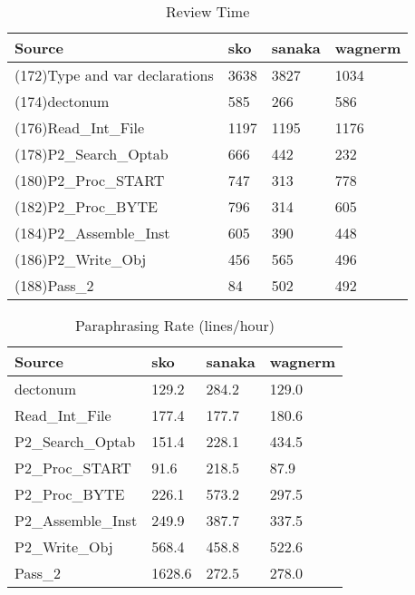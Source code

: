 \begin{table}[hb]
\begin{center}
\begin{tabular}{|l|l|l|l|}
\hline
Source & sko & sanaka & wagnerm\\
\hline
(172)Type and var declarations & 3638 & 3827 & 1034\\
(174)dectonum & 585 & 266 & 586\\
(176)Read\_Int\_File & 1197 & 1195 & 1176\\
(178)P2\_Search\_Optab & 666 & 442 & 232\\
(180)P2\_Proc\_START & 747 & 313 & 778\\
(182)P2\_Proc\_BYTE & 796 & 314 & 605\\
(184)P2\_Assemble\_Inst & 605 & 390 & 448\\
(186)P2\_Write\_Obj & 456 & 565 & 496\\
(188)Pass\_2 & 84 & 502 & 492\\
\hline
\end{tabular}
\end{center}
\caption{Review Time}
\end{table}

\begin{table}[hb]
\begin{center}
\begin{tabular}{|l|l|l|l|}
\hline
Source & sko & sanaka & wagnerm\\
\hline
dectonum & 129.2 & 284.2 & 129.0\\
Read\_Int\_File & 177.4 & 177.7 & 180.6\\
P2\_Search\_Optab & 151.4 & 228.1 & 434.5\\
P2\_Proc\_START & 91.6 & 218.5 & 87.9\\
P2\_Proc\_BYTE & 226.1 & 573.2 & 297.5\\
P2\_Assemble\_Inst & 249.9 & 387.7 & 337.5\\
P2\_Write\_Obj & 568.4 & 458.8 & 522.6\\
Pass\_2 & 1628.6 & 272.5 & 278.0\\
\hline
\end{tabular}
\end{center}
\caption{Paraphrasing Rate (lines/hour)}
\end{table}

